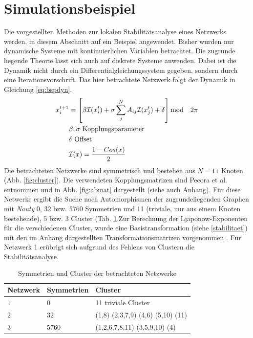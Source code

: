 \section{Simulationsbeispiel}
Die vorgestellten Methoden zur lokalen Stabilitätsanalyse eines Netzwerks werden, in diesem Abschnitt auf ein Beispiel angewendet. Bisher wurden nur dynamische Systeme mit kontinuierlichen Variablen betrachtet. Die zugrunde liegende Theorie lässt sich auch auf diskrete Systeme anwenden. Dabei ist die Dynamik nicht durch ein Differentialgleichungssystem gegeben, sondern durch eine Iterationsvorschrift. Das hier betrachtete Netzwerk \cite{pecora2014} folgt der Dynamik in Gleichung \ref{eq:bspdyn}.
\begin{align}
\label{eq:bspdyn}
	x_i^{t+1}&=\left[\beta\mathcal{I}(x_i^t)+\sigma \sum_j^N A_{ij}\mathcal{I}(x_j^t)+\delta\right] \text{mod}\quad 2\pi
	\\\notag & \beta,\sigma \text{ Kopplungsparameter}
	\\\notag  & \delta \text{ Offset}
	\\\notag &\mathcal{I}(x)=\frac{1-Cos(x)}{2}
\end{align}
Die betrachteten Netzwerke sind symmetrisch und bestehen aus $N=11$ Knoten  (Abb. \ref{fig:cluster}). Die verwendeten Kopplungsmatrizen sind Pecora et al. \cite{pecora2014} entnommen und in Abb. \ref{fig:abmat} dargestellt (siehe auch Anhang). Für diese Netwerke ergibt die Suche nach Automorphismen der zugrundeliegenden Graphen mit \textit{Nauty} 0, 32 bzw. 5760 Symmetrien und 11 (triviale, nur aus einem Knoten bestehende), 5 bzw. 3 Cluster (Tab. \ref{tab:netzwerke}.Zur Berechnung der Ljaponow-Exponenten für die verschiedenen Cluster, wurde eine Basistransformation (siehe \ref{stabilitaet}) mit den im Anhang dargestellten Transformationsmatrizen vorgenommen \cite{pecora2014,sagenotebook}.
Für Netzwerk 1 erübrigt sich aufgrund des Fehlens von Clustern die Stabilitätsanalyse.\\

\begin{table}[]
	\begin{center}
		\caption{Symmetrien und Cluster der betrachteten Netzwerke}
		\label{tab:netzwerke} 
		
		\begin{tabular}{lll}
			Netzwerk & Symmetrien & Cluster                           \\
			\hline
			1        & 0          & 11 triviale Cluster               \\
			2        & 32         & (1,8) (2,3,7,9) (4,6) (5,10) (11) \\
			3        & 5760       & (1,2,6,7,8,11) (3,5,9,10) (4) \\  
			\hline
		\end{tabular}
	\end{center}
\end{table}

